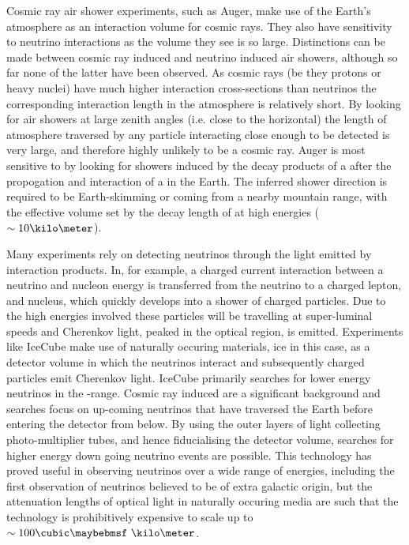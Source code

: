 Cosmic ray air shower experiments, such as Auger, make use of the Earth's atmosphere as an interaction volume for cosmic rays. They also have sensitivity to neutrino interactions as the volume they see is so large. Distinctions can be made between cosmic ray induced and neutrino induced air showers, although so far none of the latter have been observed. As cosmic rays (be they protons or heavy nuclei) have much higher interaction cross-sections than neutrinos the corresponding interaction length in the atmosphere is relatively short. By looking for air showers at large zenith angles (i.e. close to the horizontal) the length of atmosphere traversed by any particle interacting close enough to be detected is very large, and therefore highly unlikely to be a cosmic ray. Auger is most sensitive to \Pnut by looking for showers induced by the decay products of a \Ptau after the propogation and interaction of a \Pnut in the Earth. The inferred shower direction is required to be Earth-skimming or coming from a nearby mountain range, with the effective volume set by the decay length of \Ptau at high energies ($\sim 10 \kilo\meter$).


Many experiments rely on detecting neutrinos through the light emitted by interaction products. In, for example, a charged current interaction between a neutrino and nucleon energy is transferred from the neutrino to a charged lepton, and nucleus, which quickly develops into a shower of charged particles. Due to the high energies involved these particles will be travelling at super-luminal speeds and Cherenkov light, peaked in the optical region, is emitted. Experiments like IceCube make use of naturally occuring materials, ice in this case, as a detector volume in which the neutrinos interact and subsequently charged particles emit Cherenkov light. IceCube primarily searches for lower energy neutrinos in the \TeV-\PeV range. Cosmic ray induced \Pmu are a significant background and searches focus on up-coming neutrinos that have traversed the Earth before entering the detector from below. By using the outer layers of light collecting photo-multiplier tubes, and hence fiducialising the detector volume, searches for higher energy down going neutrino events are possible. This technology has proved useful in observing neutrinos over a wide range of energies, including the first observation of neutrinos believed to be of extra galactic origin, but the attenuation lengths of optical light in naturally occuring media are such that the technology is prohibitively expensive to scale up to $\sim 100 \cubic\km$.


